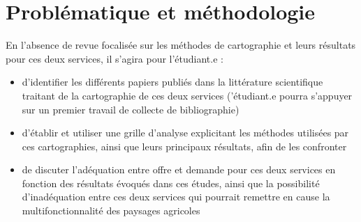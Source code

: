 \documentclass[11pt,a4paper,final]{article}
\begin{document}
\section{Problématique et méthodologie}

En l'absence de revue focalisée sur les méthodes de cartographie et leurs résultats pour ces deux services, il s'agira pour l'étudiant.e :\\

\begin{itemize}

\item d'identifier les différents papiers publiés dans la littérature scientifique traitant de la cartographie de ces deux services ('étudiant.e pourra s'appuyer sur un premier travail de collecte de bibliographie)

\item d'établir et utiliser une grille d'analyse explicitant les méthodes utilisées par ces cartographies, ainsi que leurs principaux résultats, afin de les confronter

\item de discuter l'adéquation entre offre et demande pour ces deux services en fonction des résultats évoqués dans ces études, ainsi que la possibilité d'inadéquation entre ces deux services qui pourrait remettre en cause la multifonctionnalité des paysages agricoles
\end{itemize}

\newpage



\end{document}

